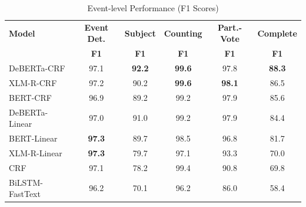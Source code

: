 \begin{table}[ht]
\centering
\caption{Event-level Performance (F1 Scores)}
\label{tab:event_results}
\begin{tabular}{lccccc}
\toprule
\textbf{Model} & \textbf{Event Det.} & \textbf{Subject} & \textbf{Counting} & \textbf{Part.-Vote} & \textbf{Complete} \\
 & \textbf{F1} & \textbf{F1} & \textbf{F1} & \textbf{F1} & \textbf{F1} \\
\midrule
DeBERTa-CRF & 97.1 & \textbf{92.2} & \textbf{99.6} & 97.8 & \textbf{88.3} \\
XLM-R-CRF & 97.2 & 90.2 & \textbf{99.6} & \textbf{98.1} & 86.5 \\
BERT-CRF & 96.9 & 89.2 & 99.2 & 97.9 & 85.6 \\
DeBERTa-Linear & 97.0 & 91.0 & 99.2 & 97.9 & 84.4 \\
BERT-Linear & \textbf{97.3} & 89.7 & 98.5 & 96.8 & 81.7 \\
XLM-R-Linear & \textbf{97.3} & 79.7 & 97.1 & 93.3 & 70.0 \\
CRF & 97.1 & 78.2 & 99.4 & 90.8 & 69.8 \\
BiLSTM-FastText & 96.2 & 70.1 & 96.2 & 86.0 & 58.4 \\
\bottomrule
\end{tabular}
\end{table}